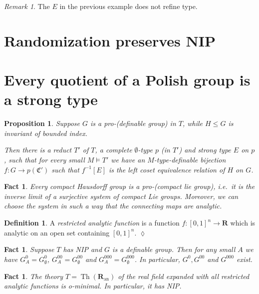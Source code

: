\documentclass[final,a4paper,12pt]{amsart}
\newcommand{\fC}{{\mathfrak C}}
\newcommand{\bR}{{\mathbf{R}}}
\newcommand{\an}{\mathrm{an}}
\DeclareMathOperator{\Th}{{Th}}
\newtheorem{fct}[thm]{Fact}
\newtheorem{prop}[thm]{Proposition}
\theoremstyle{remark}
\newtheorem{rem}[thm]{Remark}
\theoremstyle{definition}
\newtheorem{dfn}[thm]{Definition}
\newcommand{\xqed}[1]{%
	\leavevmode\unskip\penalty9999 \hbox{}\nobreak\hfill
	\quad\hbox{\ensuremath{#1}}}
\begin{document}
	
	
	\begin{rem}
		The $E$ in the previous example does not refine type.
	\end{rem}
	
	\section{Randomization preserves NIP}
	
	\section{Every quotient of a Polish group is a strong type}
	\begin{prop}
		Suppose $G$ is a pro-(definable group) in $T$, while $H\leq G$ is invariant of bounded index.
		
		Then there is a reduct $T'$ of $T$, a complete $\emptyset$-type $p$ (in $T'$) and strong type $E$ on $p$, such that for every small $M\models T'$ we have an $M$-type-definable bijection $f\colon G\to p(\fC')$ such that $f^{-1}[E]$ is the left coset equivalence relation of $H$ on $G$.
	\end{prop}
	
	\begin{fct}
		Every compact Hausdorff group is a pro-(compact lie group), i.e.\ it is the inverse limit of a surjective system of compact Lie groups. Moreover, we can choose the system in such a way that the connecting maps are analytic.
	\end{fct}
	
	\begin{dfn}
		A \emph{restricted analytic function} is a function $f\colon [0,1]^n\to \bR$ which is analytic on an open set containing $[0,1]^n$.\xqed{\lozenge}
	\end{dfn}
	
	\begin{fct}
		Suppose $T$ has NIP and $G$ is a definable group. Then for any small $A$ we have $G^{0}_A=G^{0}_\emptyset$, $G^{00}_A=G^{00}_\emptyset$ and $G^{000}_A=G^{000}_\emptyset$. In particular, $G^0, G^{00}$ and $G^{000}$ exist.
	\end{fct}
	
		
	\begin{fct}
		The theory $T=\Th(\bR_{\an})$ of the real field expanded with all restricted analytic functions is o-minimal. In particular, it has NIP.
	\end{fct}
\end{document}
